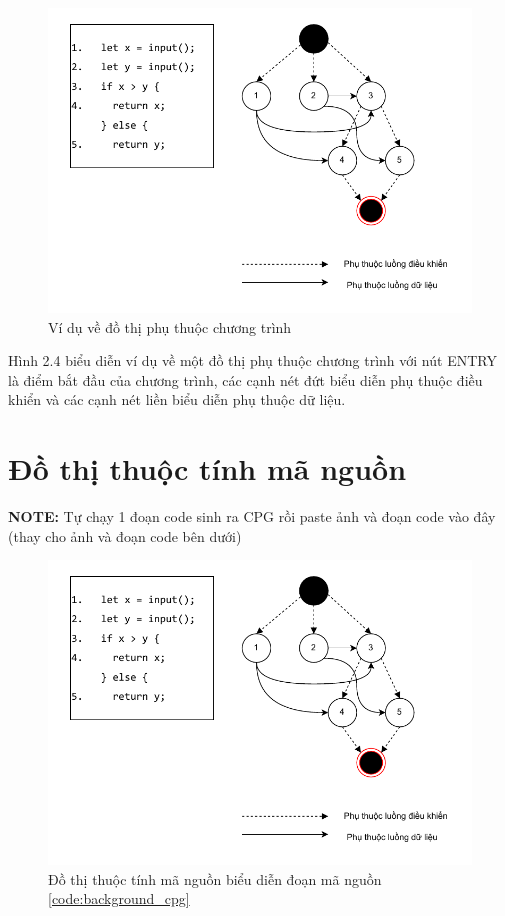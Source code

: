 \begin{figure}[H]
	\includegraphics[width=1\columnwidth]{figures/c2/c2_pdg.drawio.pdf}
	\centering
	\caption{Ví dụ về đồ thị phụ thuộc chương trình}
	\label{img:background_pdg}
\end{figure}

Hình 2.4 biểu diễn ví dụ về một đồ thị phụ thuộc chương trình với nút ENTRY là
điểm bắt đầu của chương trình, các cạnh nét đứt biểu diễn phụ thuộc điều khiển và các
cạnh nét liền biểu diễn phụ thuộc dữ liệu.

\section{Đồ thị thuộc tính mã nguồn}

\textbf{NOTE:} Tự chạy 1 đoạn code sinh ra CPG rồi paste ảnh và đoạn code vào đây (thay cho ảnh và đoạn code bên dưới)

\begin{figure}[H]
	\includegraphics[width=1\columnwidth]{figures/c2/c2_pdg.drawio.pdf}
	\centering
	\caption{Đồ thị thuộc tính mã nguồn biểu diễn đoạn mã nguồn \ref{code:background_cpg}}
	\label{img:background_cpg}
\end{figure}

